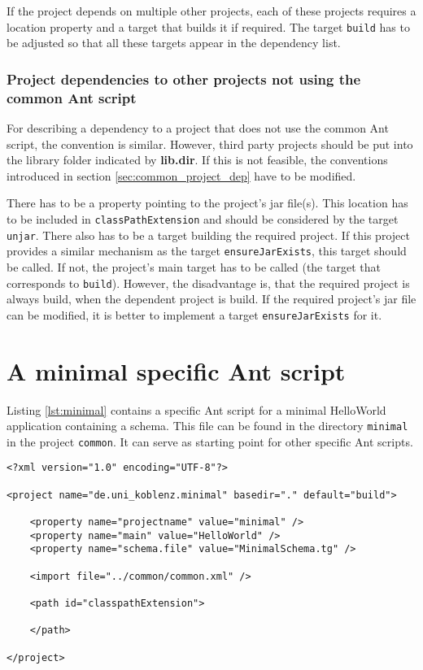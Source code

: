 \documentclass[a4paper,twoside,11pt,bibtotoc]{article}
\begin{document}
If the project depends on multiple other projects, each of these projects requires a location property and a target that builds it if required.
The target \texttt{build} has to be adjusted so that all these targets appear in the dependency list.

\subsubsection{Project dependencies to other projects not using the common Ant script}
\label{sec:arbitrary_project_dep}
For describing a dependency to a project that does not use the common Ant script, the convention is similar.
However, third party projects should be put into the library folder indicated by \textbf{lib.dir}.
If this is not feasible, the conventions introduced in section \ref{sec:common_project_dep} have to be modified.

There has to be a property pointing to the project's jar file(s).
This location has to be included in \texttt{classPathExtension} and should be considered by the target \texttt{unjar}.
There also has to be a target building the required project.
If this project provides a similar mechanism as the target \texttt{ensureJarExists}, this target should be called.
If not, the project's main target has to be called (the target that corresponds to \texttt{build}).
However, the disadvantage is, that the required project is always build, when the dependent project is build.
If the required project's jar file can be modified, it is better to implement a target \texttt{ensureJarExists} for it.

\clearpage

\appendix
\section{A minimal specific Ant script}
\label{sec:appendix}
Listing \ref{lst:minimal} contains a specific Ant script for a minimal HelloWorld application containing a schema.
This file can be found in the directory \texttt{minimal} in the project \texttt{common}.
It can serve as starting point for other specific Ant scripts.

\begin{lstlisting}[caption=Minimal specific Ant script,label=lst:minimal,float=!ht,language=Ant]
<?xml version="1.0" encoding="UTF-8"?>

<project name="de.uni_koblenz.minimal" basedir="." default="build">
	
	<property name="projectname" value="minimal" />
	<property name="main" value="HelloWorld" />
	<property name="schema.file" value="MinimalSchema.tg" />
	
	<import file="../common/common.xml" />
	
	<path id="classpathExtension">
		
	</path>
	
</project>
\end{lstlisting}
\end{document}

